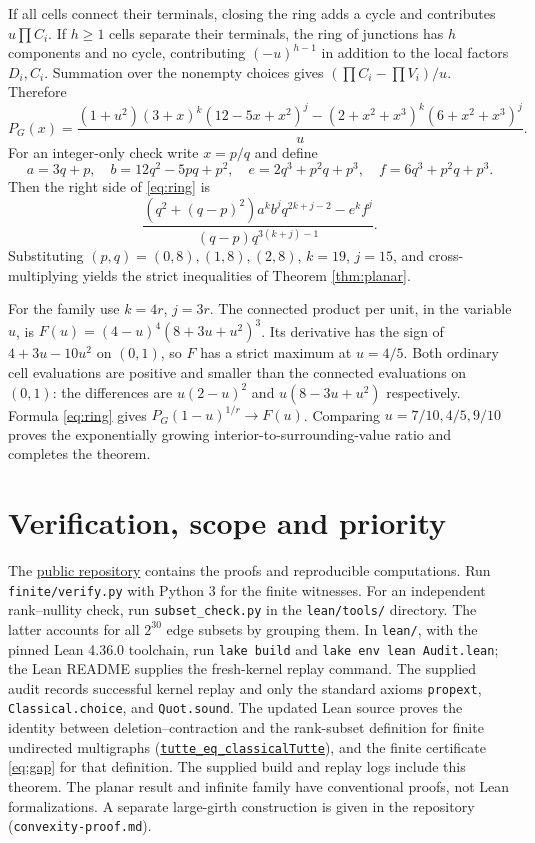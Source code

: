 \documentclass[11pt]{article}
\begin{document}
If all cells connect their terminals, closing the ring adds a cycle and contributes $u\prod C_i$. If $h\ge1$ cells separate their terminals, the ring of junctions has $h$ components and no cycle, contributing $(-u)^{h-1}$ in addition to the local factors $D_i,C_i$. Summation over the nonempty choices gives $(\prod C_i-\prod V_i)/u$. Therefore
\begin{equation}\label{eq:ring}
P_G(x)=\frac{(1+u^2)(3+x)^k(12-5x+x^2)^j
 -(2+x^2+x^3)^k(6+x^2+x^3)^j}{u}.
\end{equation}
For an integer-only check write $x=p/q$ and define
\[
a=3q+p,\quad b=12q^2-5pq+p^2,\quad e=2q^3+p^2q+p^3,\quad f=6q^3+p^2q+p^3.
\]
Then the right side of \eqref{eq:ring} is
\[
\frac{(q^2+(q-p)^2)a^k b^j q^{2k+j-2}-e^k f^j}{(q-p)q^{3(k+j)-1}}.
\]
Substituting $(p,q)=(0,8),(1,8),(2,8)$, $k=19$, $j=15$, and cross-multiplying yields the strict inequalities of Theorem \ref{thm:planar}.

For the family use $k=4r$, $j=3r$. The connected product per unit, in the variable $u$, is $F(u)=(4-u)^4(8+3u+u^2)^3$. Its derivative has the sign of $4+3u-10u^2$ on $(0,1)$, so $F$ has a strict maximum at $u=4/5$. Both ordinary cell evaluations are positive and smaller than the connected evaluations on $(0,1)$: the differences are $u(2-u)^2$ and $u(8-3u+u^2)$ respectively. Formula \eqref{eq:ring} gives $P_G(1-u)^{1/r}\to F(u)$. Comparing $u=7/10,4/5,9/10$ proves the exponentially growing interior-to-surrounding-value ratio and completes the theorem.
\section{Verification, scope and priority}
The \href{https://github.com/Luisproofs/conde-merino-convexity-disproof}{public repository} contains the proofs and reproducible computations. Run \texttt{finite/verify.py} with Python 3 for the finite witnesses. For an independent rank--nullity check, run \texttt{subset\_check.py} in the \texttt{lean/tools/} directory. The latter accounts for all $2^{30}$ edge subsets by grouping them. In \texttt{lean/}, with the pinned Lean 4.36.0 toolchain, run \texttt{lake build} and \texttt{lake env lean Audit.lean}; the Lean README supplies the fresh-kernel replay command. The supplied audit records successful kernel replay and only the standard axioms \texttt{propext}, \texttt{Classical.choice}, and \texttt{Quot.sound}. The updated Lean source proves the identity between deletion--contraction and the rank-subset definition for finite undirected multigraphs (\href{https://github.com/Luisproofs/conde-merino-convexity-disproof/blob/main/lean/CondeMerino/RankSubset.lean}{\texttt{tutte\_eq\_classicalTutte}}), and the finite certificate \eqref{eq:gap} for that definition. The supplied build and replay logs include this theorem. The planar result and infinite family have conventional proofs, not Lean formalizations. A separate large-girth construction is given in the repository (\texttt{convexity-proof.md}).
\end{document}

